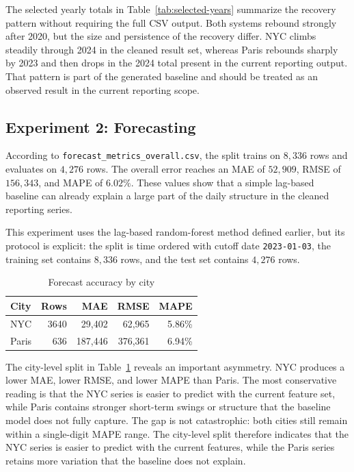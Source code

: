 \documentclass[10pt,twocolumn,a4paper]{article}
\begin{document}
The selected yearly totals in Table~\ref{tab:selected-years} summarize the
recovery pattern without requiring the full CSV output. Both systems rebound
strongly after 2020, but the size and persistence
of the recovery differ. NYC climbs steadily through 2024 in the cleaned result
set, whereas Paris rebounds sharply by 2023 and then drops in the 2024 total
present in the current reporting output. That pattern is part of the generated
baseline and should be treated as an observed result in the current reporting
scope.

\subsection{Experiment 2: Forecasting}

According to
\nolinkurl{forecast_metrics_overall.csv}, the split trains on \(8{,}336\)
rows and evaluates on \(4{,}276\) rows. The overall error reaches an MAE of
\(52{,}909\), RMSE of \(156{,}343\), and MAPE of \(6.02\%\). These values show
that a simple lag-based baseline can already explain a large part of the daily
structure in the cleaned reporting series.

This experiment uses the lag-based random-forest method defined earlier, but
its protocol is explicit: the split is time ordered with cutoff date
\texttt{2023-01-03}, the training set contains \(8{,}336\) rows, and the test
set contains \(4{,}276\) rows.

\begin{table}[t]
\centering
\caption{Forecast accuracy by city}
\label{tab:forecast-city}
\begin{tabular}{lrrrr}
\toprule
City & Rows & MAE & RMSE & MAPE \\
\midrule
NYC & 3640 & 29,402 & 62,965 & 5.86\% \\
Paris & 636 & 187,446 & 376,361 & 6.94\% \\
\bottomrule
\end{tabular}
\end{table}

The city-level split in Table~\ref{tab:forecast-city} reveals an important
asymmetry. NYC produces a lower MAE, lower RMSE, and lower MAPE than Paris. The
most conservative reading is that the NYC series is easier to predict with the
current feature set, while Paris contains stronger short-term swings or
structure that the baseline model does not fully capture. The gap is not
catastrophic: both cities still remain within a single-digit MAPE range. The
city-level split therefore indicates that the NYC series is easier to predict
with the current features, while the Paris series retains more variation that
the baseline does not explain.
\end{document}
